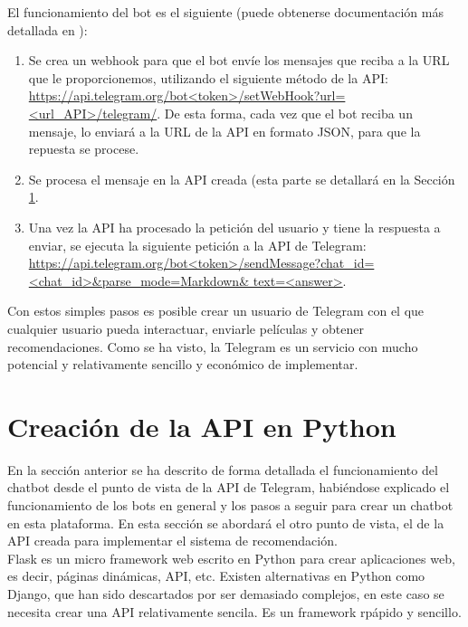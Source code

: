 El funcionamiento del bot es el siguiente (puede obtenerse documentación más detallada en \cite{Telegram}):

\begin{enumerate}
    \item Se crea un webhook para que el bot envíe los mensajes que reciba a la URL que le proporcionemos, utilizando el siguiente método de la API: \url{https://api.telegram.org/bot<token>/setWebHook?url=<url_API>/telegram/}. De esta forma, cada vez que el bot reciba un mensaje, lo enviará a la URL de la API en formato JSON, para que la repuesta se procese.
    \item Se procesa el mensaje en la API creada (esta parte se detallará en la Sección \ref{sec:API}.
    \item Una vez la API ha procesado la petición del usuario y tiene la respuesta a enviar, se ejecuta la siguiente petición a la API de Telegram: \url{https://api.telegram.org/bot<token>/sendMessage?chat_id=<chat_id>&parse_mode=Markdown& text=<answer>}.
\end{enumerate}

Con estos simples pasos es posible crear un usuario de Telegram con el que cualquier usuario pueda interactuar, enviarle películas y obtener recomendaciones. Como se ha visto, la Telegram es un servicio con mucho potencial y relativamente sencillo y económico de implementar.

\section{Creación de la API en Python} \label{sec:API}

En la sección anterior se ha descrito de forma detallada el funcionamiento del chatbot desde el punto de vista de la API de Telegram, habiéndose explicado el funcionamiento de los bots en general y los pasos a seguir para crear un chatbot en esta plataforma. En esta sección se abordará el otro punto de vista, el de la API creada para implementar el sistema de recomendación.\\

Flask es un micro framework web escrito en Python para crear aplicaciones web, es decir, páginas dinámicas, API, etc. Existen alternativas en Python como Django, que han sido descartados por ser demasiado complejos, en este caso se necesita crear una API relativamente sencila. Es un framework rpápido y sencillo.

\begin{figure}[H]
    \centering
    \captionsetup{width=7cm}
    
\end{figure}

